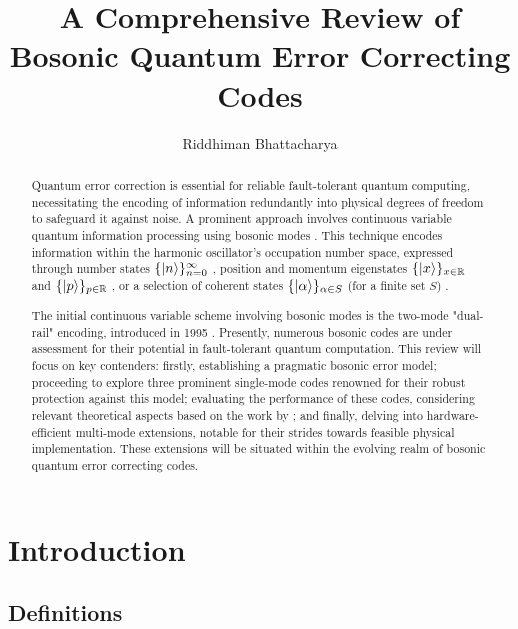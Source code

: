 \documentclass[11pt]{article}
\title{\Large \textbf{A Comprehensive Review of Bosonic Quantum Error Correcting Codes}}
\author{Riddhiman Bhattacharya}
\newcommand\0{\mathbf{0}}
\newcommand\RR{\mathbb{R}}
\newcommand\<{\langle}
\renewcommand\>{\rangle}
\begin{document}
\maketitle
\large

\begin{abstract}

Quantum error correction is essential for reliable fault-tolerant quantum computing, necessitating the encoding of information redundantly into physical degrees of freedom to safeguard it against noise. A prominent approach involves continuous variable quantum information processing using bosonic modes \cite{braunstein1998error, braunstein2005quantum, niset2008experimentally, aoki2009quantum, lloyd1998analog, lassen2010quantum}. This technique encodes information within the harmonic oscillator's occupation number space, expressed through number states $\{\ket{n}\}^\infty_{n=0}$ \cite{michael2016new}, position and momentum eigenstates $\{\ket{x}\}_{x\in\RR}$ and $\{\ket{p}\}_{p\in\RR}$ \cite{gottesman2001encoding}, or a selection of coherent states $\{\ket{\alpha}\}_{\alpha\in S}$ (for a finite set $S$) \cite{cochrane1999macroscopically}.

The initial continuous variable scheme involving bosonic modes is the two-mode "dual-rail" encoding, introduced in 1995 \cite{chuang1995simple}. Presently, numerous bosonic codes are under assessment for their potential in fault-tolerant quantum computation. This review will focus on key contenders: firstly, establishing a pragmatic bosonic error model; proceeding to explore three prominent single-mode codes renowned for their robust protection against this model; evaluating the performance of these codes, considering relevant theoretical aspects based on the work by \cite{albert2017performance}; and finally, delving into hardware-efficient multi-mode extensions, notable for their strides towards feasible physical implementation. These extensions will be situated within the evolving realm of bosonic quantum error correcting codes.
\end{abstract}



\section{Introduction}

\subsection{Definitions}
\end{document}
